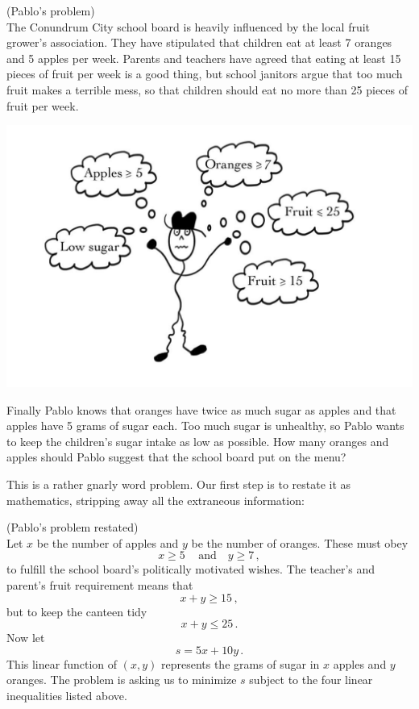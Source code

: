 \begin{example}(Pablo's problem)\\
The Conundrum City school board is heavily influenced by the local fruit grower's association. They have stipulated
that children eat at least 7 oranges and 5 apples per week. Parents and teachers have agreed that eating at least 15 pieces of fruit per
week is a good thing, but school janitors argue that too much fruit makes a terrible mess, so that children should eat no more than
25 pieces of fruit per week. 
\begin{center}
\includegraphics[alt={A confused Pablo has many thoughts in his head: "Low sugar", "Apples at least 5", "Oranges at least 7", "Fruit at most 25", and "Fruit at least 15".},scale=.3]{simplex/Pablo.jpg}
\end{center}
\noindent
Finally Pablo knows that oranges have twice as much sugar as apples
and that apples have 5 grams of sugar each. Too much sugar is unhealthy, so Pablo wants to keep the children's sugar intake as low 
as possible. How many oranges and apples should Pablo suggest that the school board put on the menu?
\end{example}

This is a rather gnarly word problem. Our first step is to restate it as mathematics, stripping away all the extraneous information:

\begin{example}(Pablo's problem restated)\\
Let $x$ be the number of apples and $y$ be the number of oranges. These must obey
\[
x\geq5\, \quad\mbox{and}\quad y\geq7\, ,
\]
to fulfill the school board's politically motivated wishes. The teacher's and parent's fruit requirement means that
\[
x+y\geq 15\, ,
\]
but to keep the canteen tidy
\[
x+y\leq 25\, .
\]
Now let 
\[s=5x+10y\, .\]
This linear function of $(x,y)$ represents the grams of sugar in $x$ apples and $y$ oranges.
The problem is asking us to minimize $s$ subject to the four linear inequalities listed above.
\end{example}

